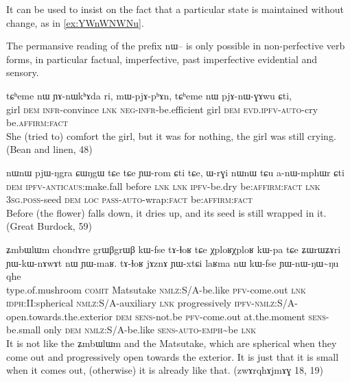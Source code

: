 \documentclass[oldfontcommands,oneside,a4paper,11pt]{article}
\newcommand{\ipa}[1]{{\phon \mbox{#1}}} %
\begin{document}
It can be used to insist on the fact  that a particular state is maintained without change, as in \ref{ex:YWnWNWNu}.

The permansive reading of the prefix \ipa{nɯ--} is only possible in non-perfective verb forms, in particular factual, imperfective, past imperfective evidential and sensory.


\begin{exe}
\ex \label{ex:pjAnWGAwu}
\gll
\ipa{tɕʰeme} 	\ipa{nɯ} 	\ipa{ɲɤ-nɯkʰɤda} 	\ipa{ri,} 	\ipa{mɯ-pjɤ-pʰɤn,} 	\ipa{tɕʰeme} 	\ipa{nɯ} 	\ipa{pjɤ-nɯ-ɣɤwu} 	\ipa{ɕti,} \\
girl \textsc{dem} \textsc{infr}-convince \textsc{lnk} \textsc{neg-infr}-be.efficient girl \textsc{dem} \textsc{evd.ipfv-auto}-cry  be.\textsc{affirm:fact} \\
\glt She (tried to) comfort the girl, but it was for nothing, the girl was still crying. (Bean and linen, 48)
\end{exe} 

\begin{exe}
\ex \label{ex:anWmphWr}
\gll
\ipa{nɯnɯ} 	\ipa{pjɯ-ŋgra} 	\ipa{ɕɯŋgɯ} 	\ipa{tɕe} 	\ipa{tɕe} 	\ipa{ɲɯ-rom} 	\ipa{ɕti} 	\ipa{tɕe,} 	\ipa{ɯ-rɣi} 	\ipa{nɯnɯ} 	\ipa{tɕu} 	\ipa{a-nɯ-mphɯr} 	\ipa{ɕti} \\
\textsc{dem} \textsc{ipfv-anticaus}:make.fall before \textsc{lnk}  \textsc{lnk} \textsc{ipfv}-be.dry be\textsc{:affirm:fact} \textsc{lnk} \textsc{3sg.poss}-seed \textsc{dem} \textsc{loc} \textsc{pass-auto}-wrap:\textsc{fact} be\textsc{:affirm:fact} \\
\glt Before (the flower) falls down, it dries up, and its seed is still wrapped in it. (Great Burdock, 59)
\end{exe} 


\begin{exe}
 \ex \label{ex:YWnWNWNu}
 \gll
\ipa{ʑmbɯlɯm}	\ipa{chondɤre}  	\ipa{grɯβgrɯβ}  	\ipa{kɯ-fse}  	\ipa{tɤ-ɬoʁ}  	\ipa{tɕe}  	\ipa{χploʁχploʁ}  	\ipa{kɯ-pa}  
\ipa{tɕe}  	\ipa{ʑɯrɯʑɤri}  	\ipa{ɲɯ-kɯ-nɤwɤt}  	\ipa{nɯ}  	\ipa{ɲɯ-maʁ.}  
\ipa{tɤ-ɬoʁ}  	\ipa{jɤznɤ}  	\ipa{ɲɯ-xtɕi}  	\ipa{laʁma}  	\ipa{nɯ}  	\ipa{kɯ-fse}  	\ipa{ɲɯ-nɯ-ŋɯ\textasciitilde{}ŋu}  	\ipa{qhe}  	\\
type.of.mushroom \textsc{comit} Matsutake \textsc{nmlz}:S/A-be.like \textsc{pfv}-come.out \textsc{lnk} \textsc{idph:II:}spherical \textsc{nmlz}:S/A-auxiliary \textsc{lnk} progressively \textsc{ipfv}-\textsc{nmlz}:S/A-open.towards.the.exterior \textsc{dem} \textsc{sens}-not.be  \textsc{pfv}-come.out at.the.moment \textsc{sens}-be.small only \textsc{dem} \textsc{nmlz}:S/A-be.like \textsc{sens-auto}-\textsc{emph}\textasciitilde{}be \textsc{lnk} \\
\glt It is not like the \ipa{ʑmbɯlɯm} and the Matsutake, which are spherical when they come out and progressively open towards the exterior. It is just that it is small when it comes out, (otherwise) it is already like that.
 (\ipa{zwɤrqhɤjmɤɣ} 18, 19)
 \end{exe}
\end{document}
